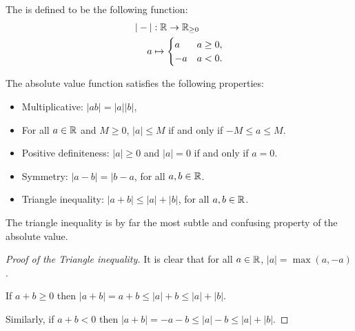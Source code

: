 \begin{definition}
  The  is defined to be the following function:
  \begin{align*}
    |-| &: \mathbb{R} \to \mathbb{R}_{\geq 0} \\
    a &\mapsto \begin{cases}
    a & a \geq 0, \\
    -a & a < 0.
    \end{cases}
  \end{align*}
\end{definition}

\begin{theorem}
  The absolute value function satisfies the following properties:
  \begin{itemize}
    \item Multiplicative: \(|ab| = |a||b|\),
    \item For all \(a \in \mathbb{R}\) and \(M \geq 0\), \(|a| \leq M\) if and only if \(-M \leq a \leq M\).
    \item Positive definiteness: \(|a| \geq 0\) and \(|a| = 0\) if and only if \(a = 0\).
    \item Symmetry: \(|a - b| = |b - a\), for all \(a, b \in \mathbb{R}\).
    \item Triangle inequality: \(|a + b| \leq |a| + |b|\), for all \(a, b \in \mathbb{R}\).
  \end{itemize}
\end{theorem}

The triangle inequality is by far the most subtle and confusing property of the absolute value.
\begin{proof}[Proof of the Triangle inequality]
  It is clear that for all \(a \in \mathbb{R}\), \(|a| = \max(a, -a)\).

  If \(a + b \geq 0\) then \(|a + b| = a + b \leq |a| + b \leq |a| + |b|\).

  Similarly, if \(a + b < 0\) then \(|a + b| = -a -b \leq |a| -b \leq |a| + |b|\).
\end{proof}

